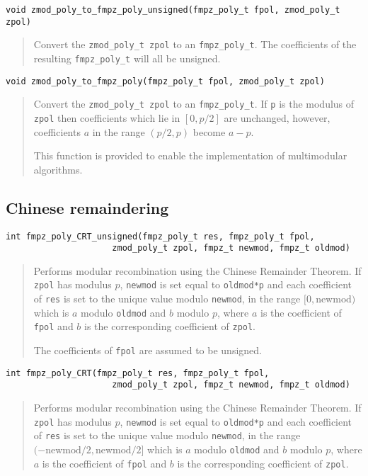 \documentclass[a4paper,10pt]{article}
\newcommand{\code}{\lstinline}
\begin{document}
\begin{lstlisting}
void zmod_poly_to_fmpz_poly_unsigned(fmpz_poly_t fpol, zmod_poly_t zpol)\end{lstlisting}
\begin{quote}
Convert the \code{zmod_poly_t zpol} to an \code{fmpz_poly_t}. The coefficients of the resulting \code{fmpz_poly_t} will all be unsigned.
\end{quote}

\begin{lstlisting}
void zmod_poly_to_fmpz_poly(fmpz_poly_t fpol, zmod_poly_t zpol)\end{lstlisting}
\begin{quote}
Convert the \code{zmod_poly_t zpol} to an \code{fmpz_poly_t}. If \code{p} is the modulus of \code{zpol} then coefficients which lie in $[0, p/2]$ are unchanged, however, coefficients $a$ in the range $(p/2, p)$ become $a - p$.

This function is provided to enable the implementation of multimodular algorithms.
\end{quote}

\subsection{Chinese remaindering}

\begin{lstlisting}
int fmpz_poly_CRT_unsigned(fmpz_poly_t res, fmpz_poly_t fpol, 
                     zmod_poly_t zpol, fmpz_t newmod, fmpz_t oldmod)
\end{lstlisting}
\begin{quote}
Performs modular recombination using the Chinese Remainder Theorem. If \code{zpol} has modulus $p$, \code{newmod} is set equal to \code{oldmod*p} and each coefficient of \code{res} is set to the unique value modulo \code{newmod}, in the range $[0, \mbox{newmod})$ which is $a$ modulo \code{oldmod} and $b$ modulo $p$, where $a$ is the coefficient of \code{fpol} and $b$ is the corresponding coefficient of \code{zpol}.

The coefficients of \code{fpol} are assumed to be unsigned. 
\end{quote}

\begin{lstlisting}
int fmpz_poly_CRT(fmpz_poly_t res, fmpz_poly_t fpol, 
                     zmod_poly_t zpol, fmpz_t newmod, fmpz_t oldmod)
\end{lstlisting}
\begin{quote}
Performs modular recombination using the Chinese Remainder Theorem. If \code{zpol} has modulus $p$, \code{newmod} is set equal to \code{oldmod*p} and each coefficient of \code{res} is set to the unique value modulo \code{newmod}, in the range $(-\mbox{newmod}/2, \mbox{newmod}/2]$ which is $a$ modulo \code{oldmod} and $b$ modulo $p$, where $a$ is the coefficient of \code{fpol} and $b$ is the corresponding coefficient of \code{zpol}. 
\end{quote}
\end{document}
